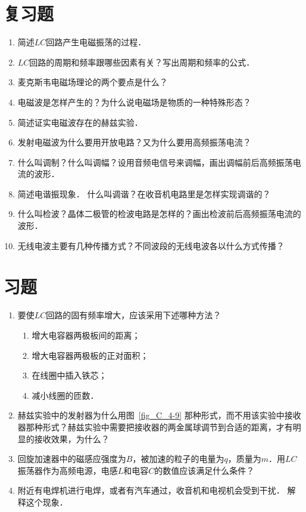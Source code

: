 \section*{复习题}
\begin{enumerate}
    \item 简述$LC$回路产生电磁振荡的过程．
    \item $LC$回路的周期和频率跟哪些因素有关？写出周期和频率的公式．
    \item 麦克斯韦电磁场理论的两个要点是什么？
    \item 电磁波是怎样产生的？为什么说电磁场是物质的一种特殊形态？
    \item 简述证实电磁波存在的赫兹实验．
    \item 发射电磁波为什么要用开放电路？又为什么要用高频振荡电流？
    \item 什么叫调制？什么叫调幅？设用音频电信号来调幅，画出调幅前后高频振荡电流的波形．
    \item 简述电谐振现象．
    什么叫调谐？在收音机电路里是怎样实现调谐的？
    \item 什么叫检波？晶体二极管的检波电路是怎样的？画出检波前后高频振荡电流的波形．
    \item 无线电波主要有几种传播方式？不同波段的无线电波各以什么方式传播？
\end{enumerate}

\section*{习题}
\begin{enumerate}
    \item 要使$LC$回路的固有频率增大，应该采用下述哪种方法？
    \begin{enumerate}
        \item 增大电容器两极板间的距离；
        \item 增大电容器两极板的正对面积；
        \item 在线圈中插入铁芯；
        \item 减小线圈的匝数．
    \end{enumerate}
    \item 赫兹实验中的发射器为什么用图~\ref{fig_C_4-9} 那种形式，而不用该实验中接收器那种形式？赫兹实验中需要把接收器的两金属球调节到合适的距离，才有明显的接收效果，为什么？
    \item 回旋加速器中的磁感应强度为$B$，被加速的粒子的电量为$q$，质量为$m$．用$LC$振荡器作为高频电源，电感$L$和电容$C$的数值应该满足什么条件？
    \item 附近有电焊机进行电焊，或者有汽车通过，收音机和电视机会受到干扰．
    解释这个现象．
\end{enumerate}



